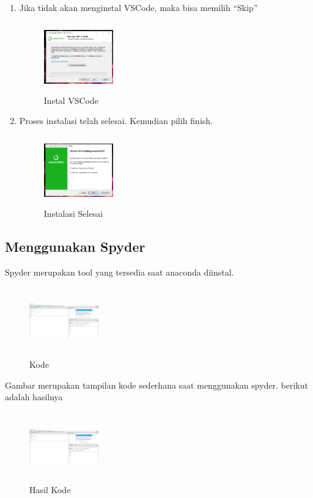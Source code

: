 \begin{enumerate}
\item Jika tidak akan menginstal VSCode, maka bisa memilih “Skip”
\begin{figure}[!htbp]
    \centering
    \includegraphics[width=3cm,height=3cm]{figures/8.png}
    \caption{Instal VSCode}
    \label{vscode}
    \end{figure}

\item Proses instalasi telah selesai. Kemudian pilih finish.
\begin{figure}[!htbp]
    \centering
    \includegraphics[width=3cm,height=3cm]{figures/9.png}
    \caption{Instalasi Selesai}
    \label{finish}
    \end{figure}
\end{enumerate}

\subsection{Menggunakan Spyder}
Spyder merupakan tool yang tersedia saat anaconda diinstal.
\begin{figure}[!htbp]
    \centering
    \includegraphics[width=3cm,height=3cm]{figures/10.png}
    \caption{Kode}
    \label{code}
    \end{figure}

Gambar merupakan tampilan kode sederhana saat menggunakan spyder. berikut adalah hasilnya
\begin{figure}[!htbp]
    \centering
    \includegraphics[width=3cm,height=3cm]{figures/11.png}
    \caption{Hasil Kode}
    \label{hasil}
    \end{figure}


